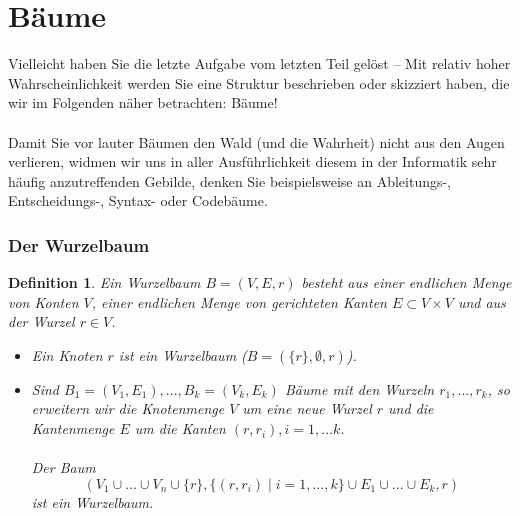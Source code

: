 \documentclass[11pt,a4paper]{scrartcl}
\newtheorem{definition}{Definition}
\begin{document}
\part{Bäume}
Vielleicht haben Sie die letzte Aufgabe vom letzten Teil gelöst -- Mit relativ hoher Wahrscheinlichkeit werden Sie eine Struktur beschrieben oder skizziert haben, die wir im Folgenden näher betrachten: Bäume! \\\\
Damit Sie vor lauter Bäumen den Wald (und die Wahrheit) nicht aus den Augen verlieren, widmen wir uns in aller Ausführlichkeit diesem in der Informatik sehr häufig anzutreffenden Gebilde, denken Sie beispielsweise an Ableitungs-, Entscheidungs-, Syntax- oder Codebäume.
\section{Der Wurzelbaum}
\begin{definition}
Ein Wurzelbaum $B = (V, E, r)$ besteht aus einer endlichen Menge von Konten $V$, einer endlichen Menge von gerichteten Kanten $E \subset V \times V$ und aus der Wurzel $r \in V$. \\
\begin{itemize}
\item Ein Knoten $r$ ist ein Wurzelbaum ($B = (\{r\}, \emptyset, r)$). 
\item Sind $B_{1} = (V_{1}, E_{1}), ..., B_{k} = (V_{k}, E_{k})$ Bäume mit den Wurzeln $r_{1}, ..., r_{k}$, so erweitern wir die Knotenmenge $V$ um eine neue Wurzel $r$ und die Kantenmenge $E$ um die Kanten $(r, r_{i}), i = 1, ... k$.\\\\
Der Baum
\[(V_{1} \cup ... \cup V_{n} \cup \{r\}, \{(r, r_{i}) \mid i = 1, ..., k\} \cup E_{1} \cup ... \cup E_{k}, r)\]
ist ein Wurzelbaum.
\end{itemize}
\end{definition}
\end{document}
